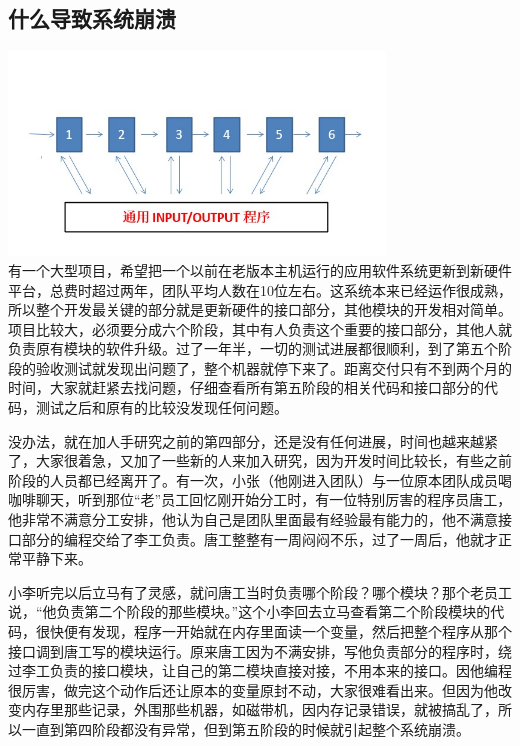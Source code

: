 \hypertarget{ux4ec0ux4e48ux5bfcux81f4ux7cfbux7edfux5d29ux6e83}{%
\subsection{什么导致系统崩溃}\label{ux4ec0ux4e48ux5bfcux81f4ux7cfbux7edfux5d29ux6e83}}

\includegraphics[width=10cm]{TC6stagesNioScreenshot_2022-10-27_192322.jpg}\\

有一个大型项目，希望把一个以前在老版本主机运行的应用软件系统更新到新硬件平台，总费时超过两年，团队平均人数在10位左右。这系统本来已经运作很成熟，所以整个开发最关键的部分就是更新硬件的接口部分，其他模块的开发相对简单。项目比较大，必须要分成六个阶段，其中有人负责这个重要的接口部分，其他人就负责原有模块的软件升级。过了一年半，一切的测试进展都很顺利，到了第五个阶段的验收测试就发现出问题了，整个机器就停下来了。距离交付只有不到两个月的时间，大家就赶紧去找问题，仔细查看所有第五阶段的相关代码和接口部分的代码，测试之后和原有的比较没发现任何问题。

没办法，就在加人手研究之前的第四部分，还是没有任何进展，时间也越来越紧了，大家很着急，又加了一些新的人来加入研究，因为开发时间比较长，有些之前阶段的人员都已经离开了。有一次，小张（他刚进入团队）与一位原本团队成员喝咖啡聊天，听到那位``老''员工回忆刚开始分工时，有一位特别厉害的程序员唐工，他非常不满意分工安排，他认为自己是团队里面最有经验最有能力的，他不满意接口部分的编程交给了李工负责。唐工整整有一周闷闷不乐，过了一周后，他就才正常平静下来。

小李听完以后立马有了灵感，就问唐工当时负责哪个阶段？哪个模块？那个老员工说，``他负责第二个阶段的那些模块。''这个小李回去立马查看第二个阶段模块的代码，很快便有发现，程序一开始就在内存里面读一个变量，然后把整个程序从那个接口调到唐工写的模块运行。原来唐工因为不满安排，写他负责部分的程序时，绕过李工负责的接口模块，让自己的第二模块直接对接，不用本来的接口。因他编程很厉害，做完这个动作后还让原本的变量原封不动，大家很难看出来。但因为他改变内存里那些记录，外围那些机器，如磁带机，因内存记录错误，就被搞乱了，所以一直到第四阶段都没有异常，但到第五阶段的时候就引起整个系统崩溃。

